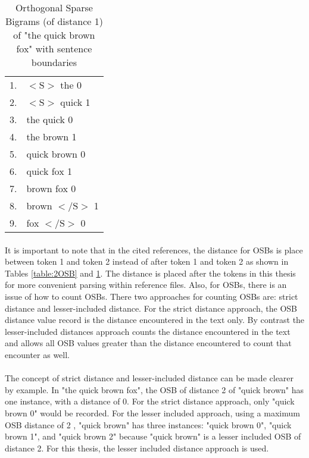 		\begin{center}
			\begin{table}[h]
			
				\begin{center}
					\begin{tabular}{ r l }
					1. & $<\text{S}>$ the 0\\
					2. & $<\text{S}>$ quick 1\\
					3. & the quick 0\\
					4. & the brown 1\\
					5. & quick brown 0\\
					6. & quick fox 1\\
					7. & brown fox 0\\
					8. & brown $<\text{/S}>$ 1\\
					9. & fox $<\text{/S}>$ 0\\
					\end{tabular}
					\caption{Orthogonal Sparse Bigrams (of distance 1) of "the quick brown fox" with sentence boundaries}
					\label{table:1OSB}
				\end{center}
			\end{table}
		\end{center}
		
		\paragraph*{} It is important to note that in the cited references, the distance for OSBs is place between token 1 and token 2 instead of after token 1 and token 2 as shown in Tables \ref{table:2OSB} and \ref{table:1OSB}.  The distance is placed after the tokens in this thesis for more convenient parsing within reference files.  Also, for OSBs, there is an issue of how to count OSBs.  There two approaches for counting OSBs are: strict distance and lesser-included distance.  For the strict distance approach, the OSB distance value record is the distance encountered in the text only.  By contrast the lesser-included distances approach counts the distance encountered in the text and allows all OSB values greater than the distance encountered to count that encounter as well.
		\paragraph*{}The concept of strict distance and lesser-included distance can be made clearer by example. In "the quick brown fox", the OSB of distance 2 of "quick brown" has one instance, with a distance of 0. For the strict distance approach, only "quick brown 0" would be recorded. For the lesser included approach, using a maximum OSB distance of 2 , "quick brown" has three instances: "quick brown 0", "quick brown 1", and "quick brown 2" because "quick brown" is a lesser included OSB of distance 2.  For this thesis, the lesser included distance approach is used.
